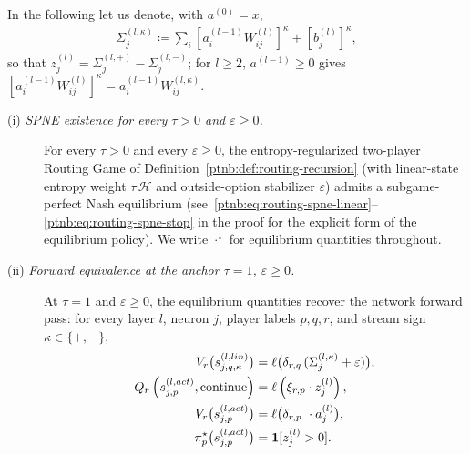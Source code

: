 In the following let us denote, with $a^{(0)} = x$,
\begin{align}\label{ptnb:eq:routing-sigma-def}
    \Sigma_j^{(l,\kappa)}
    \coloneqq \textstyle\sum_i [a_i^{(l-1)}W_{ij}^{(l)}]^\kappa + [b_j^{(l)}]^\kappa,
\end{align}
so that $z_j^{(l)} = \Sigma_j^{(l,+)} - \Sigma_j^{(l,-)}$; for $l \ge 2$, $a^{(l-1)} \ge 0$ gives
$[a_i^{(l-1)}W_{ij}^{(l)}]^\kappa = a_i^{(l-1)} W_{ij}^{(l,\kappa)}$.

\begin{theoremenv}\label{ptnb:thm:routing-forward}
\leavevmode
\begin{description}
    \item[\textnormal{(i) \emph{SPNE existence for every $\tau > 0$ and $\varepsilon \ge 0$.}}]
        For every $\tau > 0$ and every $\varepsilon \ge 0$, the entropy-regular\-ized two-player Routing Game\allowbreak
        of Definition~\ref{ptnb:def:routing-recursion} (with linear-state entropy weight $\tau\,\mathcal{H}$ and
        outside-option stabilizer $\varepsilon$) admits a subgame-perfect Nash equilibrium
        (see~\eqref{ptnb:eq:routing-spne-linear}--\allowbreak\eqref{ptnb:eq:routing-spne-stop} in the proof for the explicit
        form of the equilibrium policy). We write $\cdot^\star$ for equilibrium quantities throughout.

    \item[\textnormal{(ii) \emph{Forward equivalence at the anchor $\tau=1$, $\varepsilon\geq 0$.}}]
        At $\tau=1$ and $\varepsilon \geq 0$, the equilibrium quantities recover the network forward pass:
        for every layer $l$, neuron $j$, player labels $p,q,r$, and stream sign $\kappa\in\{+,-\}$,
        \begin{align}
            V_r\bigl(s_{j,q,\kappa}^{(l, lin)}\bigr) &= \ell\bigl(\delta_{r,q} \, (\Sigma_j^{(l,\kappa)} +
            \varepsilon)\bigr), \label{ptnb:eq:routing-forward-linear}\\
            Q_r\left( s_{j,p}^{(l, act)}, \text{continue} \right) &= \ell \left( \xi_{r,p} \cdot z^{(l)}_j
            \right), \label{ptnb:eq:routing-forward-continue} \\
            V_r\bigl(s_{j,p}^{(l, act)}\bigr) &= \ell\bigl( \delta_{r,p}\ \cdot a_j^{(l)} \bigr),
            \label{ptnb:eq:routing-forward-act}\\
            \pi_p^\star\bigl(s_{j,p}^{(l, act)}\bigr) &= \mathbf{1}[z_j^{(l)} > 0]. \label{ptnb:eq:routing-forward-stop}
        \end{align}
\end{description}\end{theoremenv}

